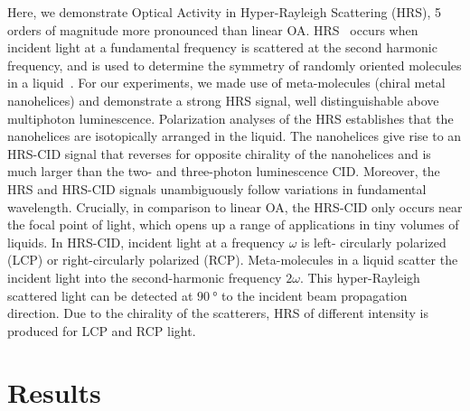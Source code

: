Here, we demonstrate Optical Activity in Hyper-Rayleigh Scattering (HRS), 5 orders of magnitude more pronounced than linear OA. HRS~\cite{Clays1991b, Clays1992} occurs when incident light at a fundamental frequency is scattered at the second harmonic frequency, and is used to determine the symmetry of randomly oriented molecules in a liquid~\cite{Verbiest1994a}.
For our experiments, we made use of meta-molecules (chiral metal nanohelices) and demonstrate a strong HRS signal, well distinguishable above multiphoton luminescence. Polarization analyses of the HRS establishes that the nanohelices are isotopically arranged in the liquid. The nanohelices give rise to an HRS-CID signal that reverses for opposite chirality of the nanohelices and is much larger than the two- and three-photon luminescence CID. Moreover, the HRS and HRS-CID signals unambiguously follow variations in fundamental wavelength. Crucially, in comparison to linear OA, the HRS-CID only occurs near the focal point of light, which opens up a range of applications in tiny volumes of liquids. 
In HRS-CID, incident light at a frequency $\omega$ is left- circularly polarized (LCP) or right-circularly polarized (RCP). Meta-molecules in a liquid scatter the incident light into the second-harmonic frequency $2\omega$. This hyper-Rayleigh scattered light can be detected at $\SI{90}{\degree}$ to the incident beam propagation direction. Due to the chirality of the scatterers, HRS of different intensity is produced for LCP and RCP light.


\section{Results}

